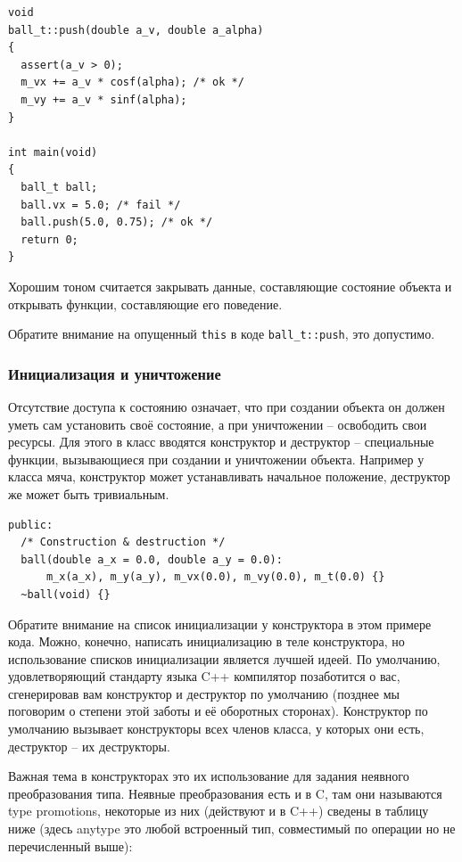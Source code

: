 \documentclass[a4paper,12pt,oneside]{article}
\begin{document}
\begin{lstlisting}
void
ball_t::push(double a_v, double a_alpha)
{
  assert(a_v > 0);
  m_vx += a_v * cosf(alpha); /* ok */
  m_vy += a_v * sinf(alpha);
}

int main(void)
{
  ball_t ball;
  ball.vx = 5.0; /* fail */
  ball.push(5.0, 0.75); /* ok */
  return 0;
}
\end{lstlisting}

Хорошим тоном считается закрывать данные, составляющие состояние объекта и открывать функции, составляющие его поведение.

Обратите внимание на опущенный \lstinline!this! в коде \lstinline!ball_t::push!, это допустимо.

\subsubsection{Инициализация и уничтожение}

Отсутствие доступа к состоянию означает, что при создании объекта он должен уметь сам установить своё состояние, а при уничтожении – освободить свои ресурсы. Для этого в класс вводятся конструктор и деструктор – специальные функции, вызывающиеся при создании и уничтожении объекта. Например у класса мяча, конструктор может устанавливать начальное положение, деструктор же может быть тривиальным.

\begin{lstlisting}
public:
  /* Construction & destruction */
  ball(double a_x = 0.0, double a_y = 0.0):
	  m_x(a_x), m_y(a_y), m_vx(0.0), m_vy(0.0), m_t(0.0) {}
  ~ball(void) {}
\end{lstlisting}

Обратите внимание на список инициализации у конструктора в этом примере кода. Можно, конечно, написать инициализацию в теле конструктора, но использование списков инициализации является лучшей идеей. По умолчанию, удовлетворяющий стандарту языка C++ компилятор позаботится о вас, сгенерировав вам конструктор и деструктор по умолчанию (позднее мы поговорим о степени этой заботы и её оборотных сторонах). Конструктор по умолчанию вызывает конструкторы всех членов класса, у которых они есть, деструктор -- их деструкторы.

Важная тема в конструкторах это их использование для задания неявного преобразования типа. Неявные преобразования есть и в C, там они называются type promotions, некоторые из них (действуют и в C++) сведены в таблицу ниже (здесь anytype это любой встроенный тип, совместимый по операции но не перечисленный выше):
\end{document}
